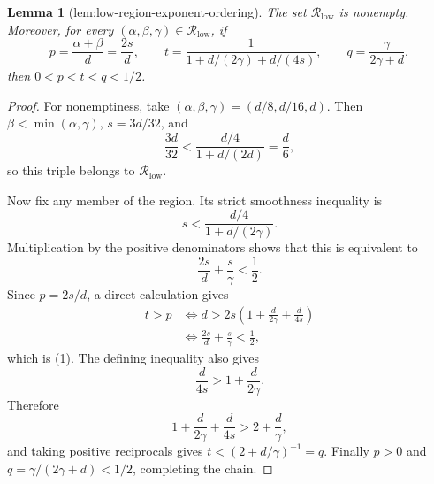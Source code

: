\documentclass{article}
\newtheorem{lemma}{Lemma}
\begin{document}
\begin{lemma}[lem:low-region-exponent-ordering]\label{lem:low-region-exponent-ordering}
The set \(\mathcal R_{\mathrm{low}}\) is nonempty.  Moreover, for every
\((\alpha,\beta,\gamma)\in\mathcal R_{\mathrm{low}}\), if
\[
p=\frac{\alpha+\beta}{d}=\frac{2s}{d},\qquad
t=\frac{1}{1+d/(2\gamma)+d/(4s)},\qquad
q=\frac{\gamma}{2\gamma+d},
\]
then \(0<p<t<q<1/2\).
\end{lemma}
\begin{proof}
For nonemptiness, take
\((\alpha,\beta,\gamma)=(d/8,d/16,d)\).  Then
\(\beta<\min(\alpha,\gamma)\), \(s=3d/32\), and
\[
\frac{3d}{32}<\frac{d/4}{1+d/(2d)}=\frac d6,
\]
so this triple belongs to \(\mathcal R_{\mathrm{low}}\).

Now fix any member of the region.  Its strict smoothness inequality is
\[
s<\frac{d/4}{1+d/(2\gamma)}.
\]
Multiplication by the positive denominators shows that this is equivalent to
\[
\frac{2s}{d}+\frac{s}{\gamma}<\frac12. \tag{1}
\]
Since \(p=2s/d\), a direct calculation gives
\[
\begin{aligned}
t>p
&\Longleftrightarrow
d>2s\left(1+\frac d{2\gamma}+\frac d{4s}\right)\\
&\Longleftrightarrow
\frac{2s}{d}+\frac{s}{\gamma}<\frac12,
\end{aligned}
\]
which is (1).  The defining inequality also gives
\[
\frac d{4s}>1+\frac d{2\gamma}.
\]
Therefore
\[
1+\frac d{2\gamma}+\frac d{4s}>2+\frac d\gamma,
\]
and taking positive reciprocals gives
\(t<(2+d/\gamma)^{-1}=q\).  Finally \(p>0\) and
\(q=\gamma/(2\gamma+d)<1/2\), completing the chain.
\end{proof}
\end{document}
